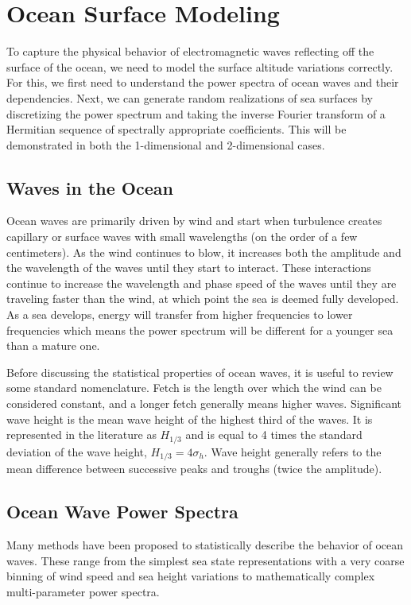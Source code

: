 \chapter{Ocean Surface Modeling}
To capture the physical behavior of electromagnetic waves reflecting off the surface of the ocean, we need to model the surface altitude variations correctly. For this, we first need to understand the power spectra of ocean waves and their dependencies. Next, we can generate random realizations of sea surfaces by discretizing the power spectrum and taking the inverse Fourier transform of a Hermitian sequence of spectrally appropriate coefficients. This will be demonstrated in both the 1-dimensional and 2-dimensional cases.

\section {Waves in the Ocean}
Ocean waves are primarily driven by wind and start when turbulence creates capillary or surface waves with small wavelengths (on the order of a few centimeters). As the wind continues to blow, it increases both the amplitude and the wavelength of the waves until they start to interact. These interactions continue to increase the wavelength and phase speed of the waves until they are traveling faster than the wind, at which point the sea is deemed fully developed. As a sea develops, energy will transfer from higher frequencies to lower frequencies which means the power spectrum will be different for a younger sea than a mature one.

Before discussing the statistical properties of ocean waves, it is useful to review some standard nomenclature. Fetch is the length over which the wind can be considered constant, and a longer fetch generally means higher waves. Significant wave height is the mean wave height of the highest third of the waves. It is represented in the literature as $H_{1/3}$ and is equal to 4 times the standard deviation of the wave height, $H_{1/3} = 4\sigma_h$. Wave height generally refers to the mean difference between successive peaks and troughs (twice the amplitude).

\section{Ocean Wave Power Spectra}  \label{os_sec:power_spectra}
Many methods have been proposed to statistically describe the behavior of ocean waves. These range from the simplest sea state representations with a very coarse binning of wind speed and sea height variations to mathematically complex multi-parameter power spectra.

